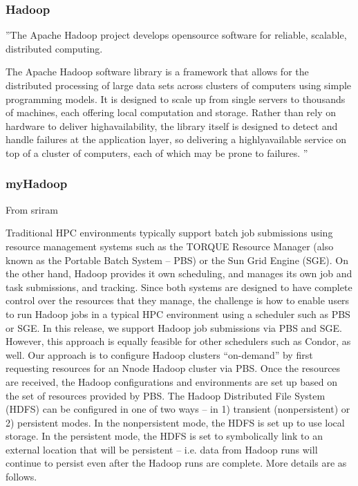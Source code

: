 
\subsubsection{Hadoop}\label{S:hadoop}

 
''The Apache Hadoop project develops opensource software for reliable, scalable, distributed computing.

The Apache Hadoop software library is a framework that allows for the distributed processing of large data sets across clusters of computers using simple programming models. It is designed to scale up from single servers to thousands of machines, each offering local computation and storage. Rather than rely on hardware to deliver highavailability, the library itself is designed to detect and handle failures at the application layer, so delivering a highlyavailable service on top of a cluster of computers, each of which may be prone to failures.
'' \cite{www/hadoop}

\subsubsection{myHadoop}

From sriram \cite{report/myhadoop}

Traditional HPC environments typically support batch job submissions
using resource management systems such as the TORQUE Resource Manager (also known as the
Portable Batch System – PBS) or the Sun Grid Engine (SGE). On the other hand, Hadoop
provides it own scheduling, and manages its own job and task submissions, and tracking.
Since both systems are designed to have complete control over the resources that they
manage, the challenge is how to enable users to run Hadoop jobs in a typical HPC
environment using a scheduler such as PBS or SGE. In this release, we support Hadoop
job submissions via PBS and SGE. However, this approach is equally feasible for other
schedulers such as Condor, as well.
Our approach is to configure Hadoop clusters “on-demand” by first requesting resources
for an Nnode Hadoop cluster via PBS. Once the resources are received, the Hadoop
configurations and environments are set up based on the set of resources provided by
PBS. The Hadoop Distributed File System (HDFS) can be configured in one of two ways
– in 1) transient (nonpersistent) or 2) persistent modes. In the nonpersistent mode, the
HDFS is set up to use local storage. In the persistent mode, the HDFS is set to
symbolically link to an external location that will be persistent – i.e. data from Hadoop
runs will continue to persist even after the Hadoop runs are complete. More details are as
follows.

